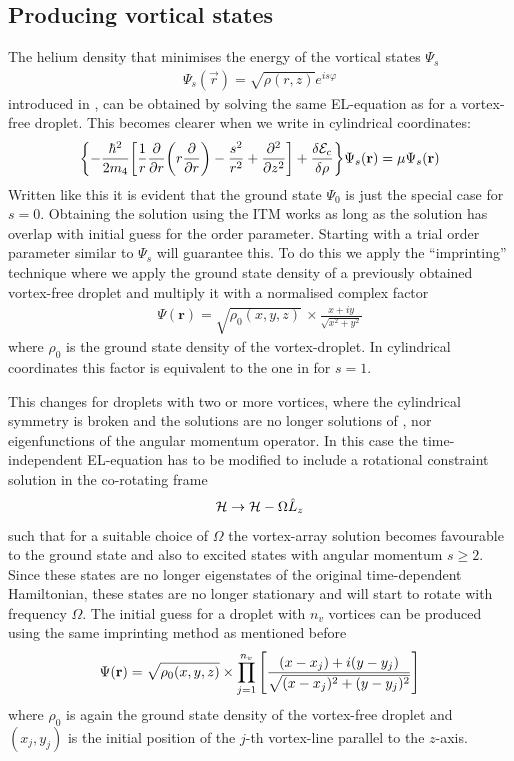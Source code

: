 		\subsection{Producing vortical states}\label{sec:vortical-states}
			The helium density that minimises the energy of the vortical states $\Psi_s$
			\begin{align}
				\Psi_s(\vec{r}) = \sqrt{\rho(r,z)}\unit{e}^{is\varphi}
			\end{align} 
			introduced in , can be obtained by solving the same EL-equation as for a vortex-free droplet. This becomes clearer when we write  in cylindrical coordinates:
			\begin{align}
				\qty{-\frac{\hbar^2}{2m_4}\qty[\frac{1}{r}\pdv{r}\qty(r\pdv{r})-\frac{s^2}{r^2}+\pdv[2]{z}]+\fdv{\mathcal{E}_c}{\rho}}\Psi_s(\vec{r}) = \mu\Psi_s(\vec{r}) \label{eq:el-cyl}
			\end{align}
			Written like this it is evident that the ground state $\Psi_0$ is just the special case for $s=0$. Obtaining the solution using the ITM works as long as the solution has overlap with initial guess for the order parameter. Starting with a trial order parameter similar to $\Psi_s$ will guarantee this. To do this we apply the ``imprinting'' technique where we apply the ground state density of a previously obtained vortex-free droplet and multiply it with a normalised complex factor
			\begin{align}
				\Psi(\mathbf{r}) = \sqrt{\rho_0(x,y,z)} \,\times \frac{x + iy}{\sqrt{x^2 + y^2}} \label{eq28}
			\end{align}
			where $\rho_0$ is the ground state density of the vortex-droplet.  In cylindrical coordinates this factor is equivalent to the one in  for $s=1$. 
			
			This changes for droplets with two or more vortices, where the cylindrical symmetry is broken and the solutions are no longer solutions of , nor eigenfunctions of the angular momentum operator. In this case the time-independent EL-equation has to be modified to include a rotational constraint solution in the co-rotating frame
			\begin{align}
				{\cal H} \rightarrow {\cal H}-\Omega \hat{L}_z
			\end{align}
			 such that for a suitable choice of $\Omega$ the vortex-array solution becomes favourable to the ground state and also to excited states with angular momentum $s\geq 2$. Since these states are no longer eigenstates of the original time-dependent Hamiltonian, these states are no longer stationary and will start to rotate with frequency $\Omega$. The initial guess for a droplet with $n_v$ vortices can be produced using the same imprinting method as mentioned before		
			\begin{align}
				\Psi(\mathbf{r})=\sqrt{\rho_0(x,y,z)} \times \prod _{j=1}^{n_v}\left[ {(x-x_j)+i(y-y_j) \over \sqrt{(x-x_j)^2+(y-y_j)^2}}  \right] \label{eq32}
			\end{align}
			where $\rho_0$ is again the ground state density of the vortex-free droplet and $(x_j,y_j)$ is the initial position of the $j$-th vortex-line parallel to the $z$-axis.

